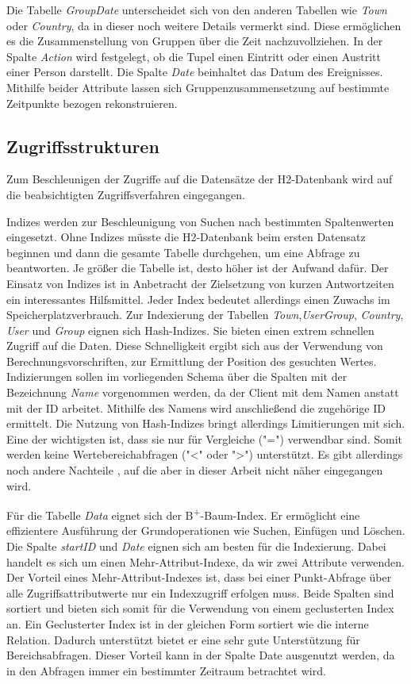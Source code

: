 Die Tabelle \textit{GroupDate} unterscheidet sich von den anderen Tabellen wie \textit{Town} oder \textit{Country}, da in dieser noch weitere Details vermerkt sind. Diese ermöglichen es die Zusammenstellung von Gruppen über die Zeit nachzuvollziehen. In der Spalte \textit{Action} wird festgelegt, ob die Tupel einen Eintritt oder einen Austritt einer Person darstellt. Die Spalte \textit{Date} beinhaltet das Datum des Ereignisses. Mithilfe beider Attribute lassen sich Gruppenzusammensetzung auf bestimmte Zeitpunkte bezogen rekonstruieren.

\subsection{Zugriffsstrukturen}

Zum Beschleunigen der Zugriffe auf die Datensätze der H2-Datenbank wird auf die beabsichtigten Zugriffsverfahren eingegangen. 

Indizes werden zur Beschleunigung von Suchen nach bestimmten Spaltenwerten eingesetzt. Ohne Indizes müsste die H2-Datenbank beim ersten Datensatz beginnen und dann die gesamte Tabelle durchgehen, um eine Abfrage zu beantworten. Je größer die Tabelle ist, desto höher ist der Aufwand dafür. Der Einsatz von Indizes ist in Anbetracht der Zielsetzung von kurzen Antwortzeiten ein interessantes Hilfsmittel. Jeder Index bedeutet allerdings einen Zuwachs im Speicherplatzverbrauch. Zur Indexierung der Tabellen \textit{Town},\textit{UserGroup}, \textit{Country}, \textit{User} und \textit{Group} eignen sich Hash-Indizes. Sie bieten einen extrem schnellen Zugriff auf die Daten. Diese Schnelligkeit ergibt sich aus der Verwendung von Berechnungsvorschriften, zur Ermittlung der Position des gesuchten Wertes. Indizierungen sollen im vorliegenden Schema über die Spalten mit der Bezeichnung \textit{Name} vorgenommen werden, da der Client mit dem Namen anstatt mit der ID arbeitet. Mithilfe des Namens wird anschließend die zugehörige ID ermittelt. Die Nutzung von Hash-Indizes bringt allerdings Limitierungen mit sich. Eine der wichtigsten ist, dass sie nur für Vergleiche ("=") verwendbar sind. Somit werden keine Wertebereichabfragen ("<" oder ">") unterstützt. Es gibt allerdings noch andere Nachteile \cite{SWB-352401869}, auf die aber in dieser Arbeit nicht näher eingegangen wird. 

Für die Tabelle \textit{Data} eignet sich der B\textsuperscript{+}-Baum-Index. Er ermöglicht eine effizientere Ausführung der Grundoperationen wie Suchen, Einfügen und Löschen. Die Spalte \textit{startID} und \textit{Date} eignen sich am besten für die Indexierung. Dabei handelt es sich um einen Mehr-Attribut-Indexe, da wir zwei Attribute verwenden. Der Vorteil eines Mehr-Attribut-Indexes ist, dass bei einer Punkt-Abfrage über alle Zugriffsattributwerte nur ein Indexzugriff erfolgen muss.
Beide Spalten sind sortiert und bieten sich somit für die Verwendung von einem geclusterten Index an. Ein Geclusterter Index ist in der gleichen Form sortiert wie die interne Relation. Dadurch unterstützt bietet er eine sehr gute Unterstützung für Bereichsabfragen. Dieser Vorteil kann in der Spalte Date ausgenutzt werden, da in den Abfragen immer ein bestimmter Zeitraum betrachtet wird.


